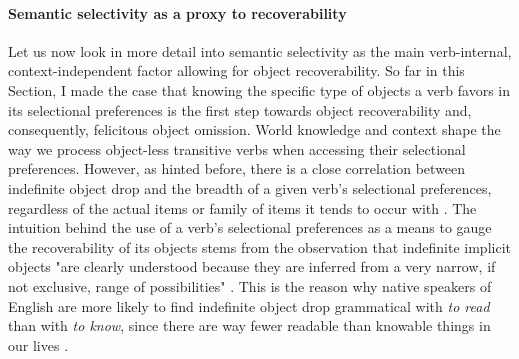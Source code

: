 \paragraph{Semantic selectivity as a proxy to recoverability}

Let us now look in more detail into semantic selectivity as the main verb-internal, context-independent factor allowing for object recoverability. So far in this Section, I made the case that knowing the specific type of objects a verb favors in its selectional preferences is the first step towards object recoverability and, consequently, felicitous object omission. World knowledge and context shape the way we process object-less transitive verbs when accessing their selectional preferences. However, as hinted before, there is a close correlation between indefinite object drop and the breadth of a given verb's selectional preferences, regardless of the actual items or family of items it tends to occur with \parencite{Garcia-VelascoMunoz2002, Liu2008, Glass2020, Medina2007, MaoueneEtAl2011, OlsenResnik1997, Resnik1993, Resnik1996}. The intuition behind the use of a verb's selectional preferences as a means to gauge the recoverability of its objects stems from the observation that indefinite implicit objects "are clearly understood because they are inferred from a very narrow, if not exclusive, range of possibilities" \parencite[4]{Garcia-VelascoMunoz2002}. This is the reason why native speakers of English are more likely to find indefinite object drop grammatical with \textit{to read} than with \textit{to know}, since there are way fewer readable than knowable things in our lives \parencite[302]{Liu2008}.\\
